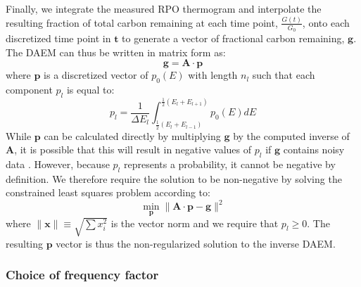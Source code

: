 %
Finally, we integrate the measured RPO thermogram and interpolate the resulting fraction of total carbon remaining at each time point, $\frac{G(t)}{G_{0}}$, onto each discretized time point in $\mathbf{t}$ to generate a vector of fractional carbon remaining, $\mathbf{g}$. The DAEM can thus be written in matrix form as:
%
\begin{equation}\label{Ch3Eq:18}
	\mathbf{g} = \mathbf{A} \cdot \mathbf{p}
\end{equation}
%
where $\mathbf{p}$ is a discretized vector of $p_{0}(E)$ with length $n_{l}$ such that each component $p_{l}$ is equal to:
%
\begin{equation}\label{Ch3Eq:19}
	p_{l} = \frac{1}{\Delta E_{l}} \int_{ \frac{1}{2} \left(E_{l} + E_{l-1} \right)}^{\frac{1}{2} \left(E_{l} + E_{l+1} \right)} p_{0}(E) dE
\end{equation}
%
While $\mathbf{p}$ can be calculated directly by multiplying $\mathbf{g}$ by the computed inverse of $\mathbf{A}$, it is possible that this will result in negative values of $p_{l}$ if $\mathbf{g}$ contains noisy data \citep{Forney:2012hz}. However, because $p_{l}$ represents a probability, it cannot be negative by definition. We therefore require the solution to be non-negative by solving the constrained least squares problem according to:
%
\begin{equation}\label{Ch3Eq:20}
	\min_{\mathbf{p}} \| \mathbf{A} \cdot \mathbf{p} - \mathbf{g} \|^{2}
\end{equation}
%
where $\| \mathbf{x} \| \equiv \sqrt{ \sum x_{i}^{2}}$ is the vector norm and we require that $p_{l} \geq 0$. The resulting $\mathbf{p}$ vector is thus the non-regularized solution to the inverse DAEM.

\subsubsection{Choice of frequency factor}

